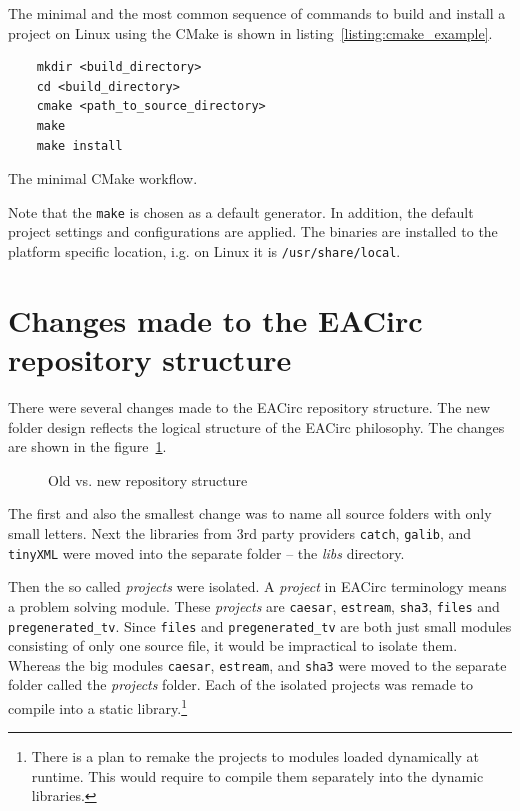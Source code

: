 \documentclass[12pt,oneside]{fithesis2}
\begin{document}
The minimal and the most common sequence of commands to build and install a project on Linux using the CMake is shown in listing~\ref{listing:cmake_example}.

\begin{listing}[h]
	\begin{verbatim}
	mkdir <build_directory>
	cd <build_directory>
	cmake <path_to_source_directory>
	make
	make install
	\end{verbatim}
	\caption{The minimal CMake workflow.}
	\label{listing:cmake_example}
\end{listing}

Note that the \texttt{make} is chosen as a default generator. In addition, the default project settings and configurations are applied. The binaries are installed to the platform specific location, i.g. on Linux it is \texttt{/usr/share/local}.

\section{Changes made to the EACirc repository structure}

There were several changes made to the EACirc repository structure. The new folder design reflects the logical structure of the EACirc philosophy. The changes are shown in the figure~\ref{fig:repository_changes}.

\begin{figure}[h]
	\centering
	
	\caption{Old vs. new repository structure}
	\label{fig:repository_changes}
\end{figure}

The first and also the smallest change was to name all source folders with only small letters. Next the libraries from 3rd party providers \texttt{catch}, \texttt{galib}, and \texttt{tinyXML} were moved into the separate folder -- the \emph{libs} directory.

Then the so called \emph{projects} were isolated. A \emph{project} in EACirc terminology means a problem solving module. These \emph{projects} are \texttt{caesar}, \texttt{estream}, \texttt{sha3}, \texttt{files} and \texttt{pregenerated\_tv}. Since \texttt{files} and \texttt{pregenerated\_tv} are both just small modules consisting of only one source file, it would be impractical to isolate them. Whereas the big modules \texttt{caesar}, \texttt{estream}, and \texttt{sha3} were moved to the separate folder called the \emph{projects} folder. Each of the isolated projects was remade to compile into a static library.\footnote{There is a plan to remake the projects to modules loaded dynamically at runtime. This would require to compile them separately into the dynamic libraries.}
\end{document}
